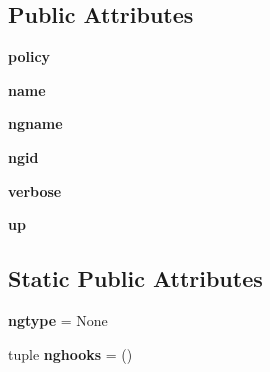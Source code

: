 \subsection*{Public Attributes}
\begin{DoxyCompactItemize}
\item 
\hypertarget{classcore_1_1bsd_1_1vnet_1_1_netgraph_net_a59f3df6f117d07dd7f392f5ca7b461e5}{{\bfseries policy}}\label{classcore_1_1bsd_1_1vnet_1_1_netgraph_net_a59f3df6f117d07dd7f392f5ca7b461e5}

\item 
\hypertarget{classcore_1_1bsd_1_1vnet_1_1_netgraph_net_a1c69a0c094a5613236bd46e64372a4b3}{{\bfseries name}}\label{classcore_1_1bsd_1_1vnet_1_1_netgraph_net_a1c69a0c094a5613236bd46e64372a4b3}

\item 
\hypertarget{classcore_1_1bsd_1_1vnet_1_1_netgraph_net_a7c228475b027f5a183c2b6b7678afd78}{{\bfseries ngname}}\label{classcore_1_1bsd_1_1vnet_1_1_netgraph_net_a7c228475b027f5a183c2b6b7678afd78}

\item 
\hypertarget{classcore_1_1bsd_1_1vnet_1_1_netgraph_net_a14a7ff8185b6371ad27df8dbc8e4c4ce}{{\bfseries ngid}}\label{classcore_1_1bsd_1_1vnet_1_1_netgraph_net_a14a7ff8185b6371ad27df8dbc8e4c4ce}

\item 
\hypertarget{classcore_1_1bsd_1_1vnet_1_1_netgraph_net_afc54f9ee0f31eb9b8a7dc26533e1a4d6}{{\bfseries verbose}}\label{classcore_1_1bsd_1_1vnet_1_1_netgraph_net_afc54f9ee0f31eb9b8a7dc26533e1a4d6}

\item 
\hypertarget{classcore_1_1bsd_1_1vnet_1_1_netgraph_net_a9f4bca42851ecd5496b52035832996dc}{{\bfseries up}}\label{classcore_1_1bsd_1_1vnet_1_1_netgraph_net_a9f4bca42851ecd5496b52035832996dc}

\end{DoxyCompactItemize}
\subsection*{Static Public Attributes}
\begin{DoxyCompactItemize}
\item 
\hypertarget{classcore_1_1bsd_1_1vnet_1_1_netgraph_net_a8283da5a71196eb43d2bb72dcd811c30}{{\bfseries ngtype} = None}\label{classcore_1_1bsd_1_1vnet_1_1_netgraph_net_a8283da5a71196eb43d2bb72dcd811c30}

\item 
\hypertarget{classcore_1_1bsd_1_1vnet_1_1_netgraph_net_acce48209c73fc10b18ddc1b220171530}{tuple {\bfseries nghooks} = ()}\label{classcore_1_1bsd_1_1vnet_1_1_netgraph_net_acce48209c73fc10b18ddc1b220171530}

\end{DoxyCompactItemize}


